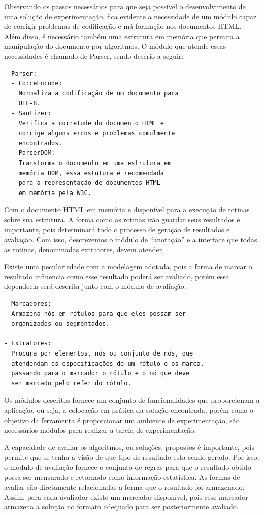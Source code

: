 \documentclass[12pt, a4paper]{article}
\begin{document}
Observando os passos necessários para que seja possível o 
desenvolvimento de uma solução de experimentação, fica evidente a
necessidade de um módulo capaz de corrigir problemas de
codificação e má formação nos documentos HTML. Além
disso, é necessário também uma estrutura em memória que permita a
manipulação do documento por algoritmos.
O módulo que atende essas necessidades é chamado de Parser, sendo 
descrio a seguir:

\begin{verbatim}
- Parser: 
  - ForceEncode:
    Normaliza a codificação de um documento para
    UTF-8.
  - Santizer:
    Verifica a corretude do documento HTML e
    corrige alguns erros e problemas comulmente
    encontrados.
  - ParserDOM:
    Transforma o documento em uma estrutura em
    memória DOM, essa estutura é recomendada
    para a representação de documentos HTML
    em memória pela W3C.
\end{verbatim}

Com o documento HTML em memória e disponível para a execução de rotinas
sobre sua estrutura. A forma como as rotinas irão guardar seus resultados
é importante, pois determinará todo o processo de geração de resultados
e avaliação. Com isso, descrevemos o módulo de ``anotação'' e a interface
que todas as rotinas, denominadas extratores, devem atender.

Existe uma peculariedade com a modelagem adotada, pois a forma de marcar
o resultado influencia como esse resultado poderá ser avaliado, porém
essa dependecia será descrita junto com o módulo de avaliação.

\begin{verbatim}
- Marcadores:
  Armazena nós em rótulos para que eles possam ser
  organizados ou segmentados.

- Extratores:
  Procura por elementos, nós ou conjunto de nós, que
  atendendam as especificações de um rótulo e os marca,
  passando para o marcador o rótulo e o nó que deve
  ser marcado pelo referido rótulo.
\end{verbatim}

Os módulos descritos fornece um conjunto de
funcionalidades que proporcionam a aplicação, ou seja, a colocação em
prática da solução encontrada,
porém como o objetivo da ferramenta é proporcionar um ambiente
de experimentação, são necessários módulos para realizar a tarefa de experimentação.

A capacidade de avaliar os algoritmos, ou soluções, propostos é
importante, pois permite que se tenha a visão de que tipo de resultado
esta sendo gerado. Por isso, o módulo de avaliação fornece o conjunto de
regras para que o resultado obtido possa ser mensurado e retornado como
informação estatística. As formas de avaliar são diretamente
relacionadas a forma que o resultado foi armazenado. Assim, para cada
avaliador existe um marcador disponível, pois esse marcador armazena a
solução no formato adequado para ser posteriormente avaliado.
\end{document}
